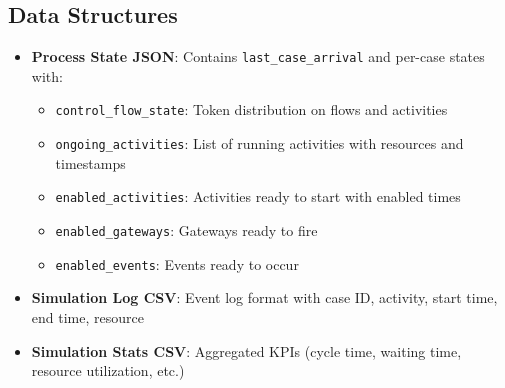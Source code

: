 \documentclass[a4paper]{article}
\begin{document}
\subsection{Data Structures}

\begin{itemize}
    \item \textbf{Process State JSON}: Contains \texttt{last\_case\_arrival} and per-case states with:
    \begin{itemize}
        \item \texttt{control\_flow\_state}: Token distribution on flows and activities
        \item \texttt{ongoing\_activities}: List of running activities with resources and timestamps
        \item \texttt{enabled\_activities}: Activities ready to start with enabled times
        \item \texttt{enabled\_gateways}: Gateways ready to fire
        \item \texttt{enabled\_events}: Events ready to occur
    \end{itemize}
    \item \textbf{Simulation Log CSV}: Event log format with case ID, activity, start time, end time, resource
    \item \textbf{Simulation Stats CSV}: Aggregated KPIs (cycle time, waiting time, resource utilization, etc.)
\end{itemize}
\end{document}
